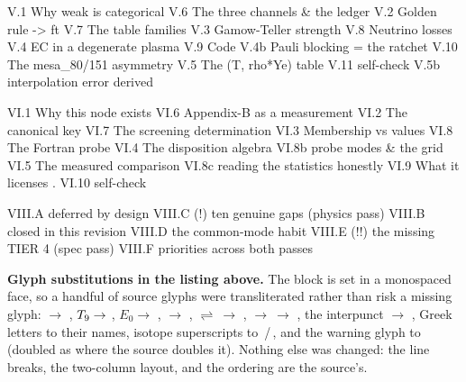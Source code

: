 \begin{srclisting}
V.1 Why weak is categorical        V.6  The three channels & the ledger
V.2 Golden rule -> ft              V.7  The table families
V.3 Gamow-Teller strength          V.8  Neutrino losses
V.4 EC in a degenerate plasma      V.9  Code
      V.4b Pauli blocking = the ratchet   V.10 The mesa_80/151 asymmetry
V.5 The (T, rho*Ye) table          V.11 self-check
      V.5b interpolation error derived

VI.1 Why this node exists          VI.6  Appendix-B as a measurement
VI.2 The canonical key             VI.7  The screening determination
VI.3 Membership vs values          VI.8  The Fortran probe
VI.4 The disposition algebra       VI.8b probe modes & the grid
VI.5 The measured comparison       VI.8c reading the statistics honestly
                                   VI.9  What it licenses . VI.10 self-check

VIII.A deferred by design          VIII.C (!) ten genuine gaps (physics pass)
VIII.B closed in this revision     VIII.D the common-mode habit
                                   VIII.E (!!) the missing TIER 4 (spec pass)
                                   VIII.F priorities across both passes
\end{srclisting}

\begin{aside}
\textbf{Glyph substitutions in the listing above.} The block is set in a
monospaced face, so a handful of source glyphs were transliterated rather than
risk a missing glyph: \sigv{} $\to$ , $T_{9} \to$ ,
$E_0 \to$ , \rhoye{} $\to$ , $\rightleftharpoons\ \to$
\code{<->}, $\to\ \to$ \code{->}, the interpunct $\to$ , Greek letters
to their names, isotope superscripts to \,/\,, and the
warning glyph to \code{(!)} (doubled as \code{(!!)} where the source doubles
it). Nothing else was changed: the line breaks, the two-column layout, and the
ordering are the source's.
\end{aside}
